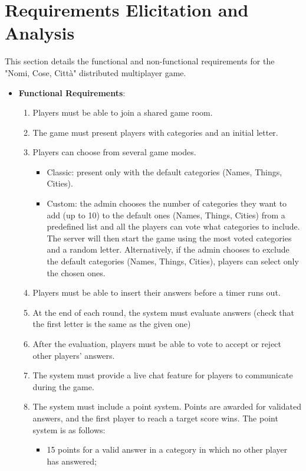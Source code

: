 \documentclass{scrartcl}
\begin{document}
\section{Requirements Elicitation and Analysis}\label{requirements}

This section details the functional and non-functional requirements for the "Nomi, Cose, Città" distributed multiplayer game.

\begin{itemize}
  \item \textbf{Functional Requirements}:
  \begin{enumerate}
    \item Players must be able to join a shared game room.
    \item The game must present players with categories and an initial letter.
    \item Players can choose from several game modes.
    \begin{itemize}
      \item Classic: present only with the default categories (Names, Things, Cities).
      \item Custom: the admin chooses the number of categories they want to add (up to 10) to the default ones (Names, Things, Cities) from a predefined list and all the players can vote what categories to include.
            The server will then start the game using the most voted categories and a random letter.
            Alternatively, if the admin chooses to exclude the default categories (Names, Things, Cities), players can select only the chosen ones.
    \end{itemize}
    \item Players must be able to insert their answers before a timer runs out.
    \item At the end of each round, the system must evaluate answers (check that the first letter is the same as the given one)
    \item After the evaluation, players must be able to vote to accept or reject other players' answers.
    \item The system must provide a live chat feature for players to communicate during the game.
    \item The system must include a point system. Points are awarded for validated answers, 
      and the first player to reach a target score wins.
      The point system is as follows:
      \begin{itemize}
        \item 15 points for a valid answer in a category in which no other player has answered;

\end{itemize}
\end{enumerate}
\end{itemize}
\end{document}
